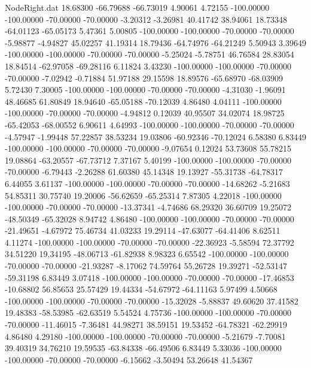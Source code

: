\begin{filecontents}{NodeRight.dat}
  18.68300  -66.79688  -66.73019     4.90061    4.72155 -100.00000 -100.00000  -70.00000  -70.00000   -3.20312   -3.26981   40.41742   38.94061
  18.73348  -64.01123  -65.05173     5.47361    5.00805 -100.00000 -100.00000  -70.00000  -70.00000   -5.98877   -4.94827   45.02257   41.19314
  18.79436  -64.74976  -64.21249     5.50943    3.39649 -100.00000 -100.00000  -70.00000  -70.00000   -5.25024   -5.78751   46.76584   28.83054
  18.84514  -62.97058  -69.28116     6.11824    3.43230 -100.00000 -100.00000  -70.00000  -70.00000   -7.02942   -0.71884   51.97188   29.15598
  18.89576  -65.68970  -68.03909     5.72430    7.30005 -100.00000 -100.00000  -70.00000  -70.00000   -4.31030   -1.96091   48.46685   61.80849
  18.94640  -65.05188  -70.12039     4.86480    4.04111 -100.00000 -100.00000  -70.00000  -70.00000   -4.94812    0.12039   40.95507   34.02074
  18.98725  -65.42053  -68.00552     6.90611    4.64993 -100.00000 -100.00000  -70.00000  -70.00000   -4.57947   -1.99448   57.22857   38.53234
  19.03806  -60.92346  -70.12024     6.58380    6.83449 -100.00000 -100.00000  -70.00000  -70.00000   -9.07654    0.12024   53.73608   55.78215
  19.08864  -63.20557  -67.73712     7.37167    5.40199 -100.00000 -100.00000  -70.00000  -70.00000   -6.79443   -2.26288   61.60380   45.14348
  19.13927  -55.31738  -64.78317     6.44055    3.61137 -100.00000 -100.00000  -70.00000  -70.00000  -14.68262   -5.21683   54.85311   30.75740
  19.20006  -56.62659  -65.25314     7.87305    4.22018 -100.00000 -100.00000  -70.00000  -70.00000  -13.37341   -4.74686   68.29320   36.60709
  19.25072  -48.50349  -65.32028     8.94742    4.86480 -100.00000 -100.00000  -70.00000  -70.00000  -21.49651   -4.67972   75.46734   41.03233
  19.29114  -47.63077  -64.41406     8.62511    4.11274 -100.00000 -100.00000  -70.00000  -70.00000  -22.36923   -5.58594   72.37792   34.51220
  19.34195  -48.06713  -61.82938     8.98323    6.65542 -100.00000 -100.00000  -70.00000  -70.00000  -21.93287   -8.17062   74.59764   55.26728
  19.39271  -52.53147  -59.31198     6.83449    3.07418 -100.00000 -100.00000  -70.00000  -70.00000  -17.46853  -10.68802   56.85653   25.57429
  19.44334  -54.67972  -64.11163     5.97499    4.50668 -100.00000 -100.00000  -70.00000  -70.00000  -15.32028   -5.88837   49.60620   37.41582
  19.48383  -58.53985  -62.63519     5.54524    4.75736 -100.00000 -100.00000  -70.00000  -70.00000  -11.46015   -7.36481   44.98271   38.59151
  19.53452  -64.78321  -62.29919     4.86480    4.29180 -100.00000 -100.00000  -70.00000  -70.00000   -5.21679   -7.70081   39.40319   34.76210
  19.59535  -63.84338  -66.49506     6.83449    5.33036 -100.00000 -100.00000  -70.00000  -70.00000   -6.15662   -3.50494   53.26648   41.54367

\end{filecontents}
